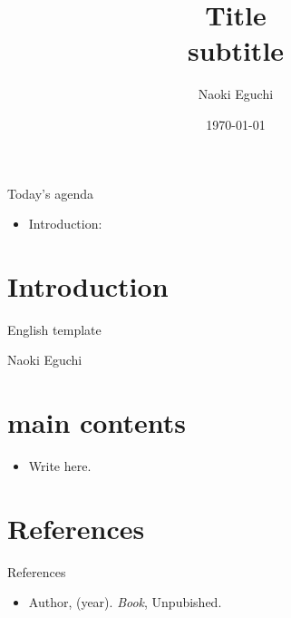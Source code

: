 \documentclass[xcolor=dvipsnames,aspectratio=169]{beamer}
\begin{document}
 

\title{Title\\ \small{subtitle}}
\author{Naoki Eguchi}          
\date{\today}

\begin{frame}                  
    \titlepage                     
\end{frame}

\begin{frame}{Today's agenda}                  
    \begin{itemize}
        \item Introduction: 
    \end{itemize}
\end{frame}

\section{Introduction}

\begin{frame}{English template}
    \begin{definition}[name]
        Naoki Eguchi
    \end{definition}
\end{frame}

\section{main contents}

\begin{frame}
    \begin{itemize}
        \item Write here.
    \end{itemize}
\end{frame}

\section*{References}

\begin{frame}{References}
    \begin{itemize}
        \item Author, (year). 
        \textit{Book}, Unpubished.
    \end{itemize}
\end{frame}
\end{document}
